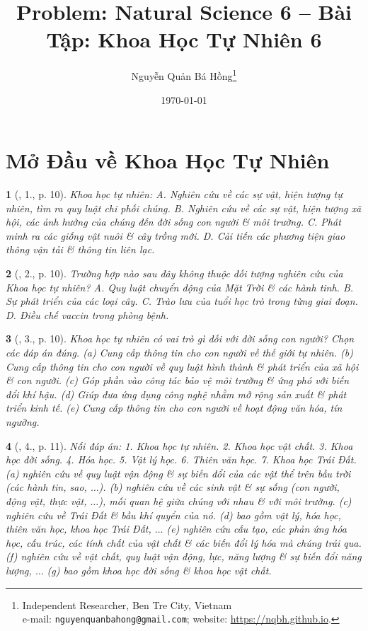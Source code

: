 \documentclass{article}
\title{Problem: Natural Science 6 -- Bài Tập: Khoa Học Tự Nhiên 6}
\author{Nguyễn Quản Bá Hồng\footnote{Independent Researcher, Ben Tre City, Vietnam\\e-mail: \texttt{nguyenquanbahong@gmail.com}; website: \url{https://nqbh.github.io}.}}
\date{\today}
\newtheorem{baitoan}{}
\begin{document}
\maketitle
\tableofcontents


\section{Mở Đầu về Khoa Học Tự Nhiên}

\begin{baitoan}[\cite{ncpt_KHTN_6_tap_1}, 1., p. 10]
	Khoa học tự nhiên: {\sf A.} Nghiên cứu về các sự vật, hiện tượng tự nhiên, tìm ra quy luật chi phối chúng. {\sf B.} Nghiên cứu về các sự vật, hiện tượng xã hội, các ảnh hưởng của chúng đến đời sống con người \& môi trường. {\sf C.} Phát minh ra các giống vật nuôi \& cây trồng mới. {\sf D.} Cải tiến các phương tiện giao thông vận tải \& thông tin liên lạc.
\end{baitoan}

\begin{baitoan}[\cite{ncpt_KHTN_6_tap_1}, 2., p. 10]
	Trường hợp nào sau đây không thuộc đối tượng nghiên cứu của Khoa học tự nhiên? {\sf A.} Quy luật chuyển động của Mặt Trời \& các hành tinh. {\sf B.} Sự phát triển của các loại cây. {\sf C.} Trào lưu của tuổi học trò trong từng giai đoạn. {\sf D.} Điều chế vaccin trong phòng bệnh.
\end{baitoan}

\begin{baitoan}[\cite{ncpt_KHTN_6_tap_1}, 3., p. 10]
	Khoa học tự nhiên có vai trò gì đối với đời sống con người? Chọn các đáp án đúng. (a) Cung cấp thông tin cho con người về thế giới tự nhiên. (b) Cung cấp thông tin cho con người về quy luật hình thành \& phát triển của xã hội \& con người. (c) Góp phần vào công tác bảo vệ môi trường \& ứng phó với biến đổi khí hậu. (d) Giúp đưa ứng dụng công nghệ nhằm mở rộng sản xuất \& phát triển kinh tế. (e) Cung cấp thông tin cho con người về hoạt động văn hóa, tín ngưỡng.
\end{baitoan}

\begin{baitoan}[\cite{ncpt_KHTN_6_tap_1}, 4., p. 11]
	Nối đáp án: 1. Khoa học tự nhiên. 2. Khoa học vật chất. 3. Khoa học đời sống. 4. Hóa học. 5. Vật lý học. 6. Thiên văn học. 7. Khoa học Trái Đất. (a) nghiên cứu về quy luật vận động \& sự biến đổi của các vật thể trên bầu trời (các hành tin, sao, $\ldots$). (b) nghiên cứu về các sinh vật \& sự sống (con người, động vật, thực vật, $\ldots$), mối quan hệ giữa chúng với nhau \& với môi trường. (c) nghiên cứu về Trái Đất \& bầu khí quyển của nó. (d) bao gồm vật lý, hóa học, thiên văn học, khoa học Trái Đất, $\ldots$ (e) nghiên cứu cấu tạo, các phản ứng hóa học, cấu trúc, các tính chất của vật chất \& các biến đổi lý hóa mà chúng trải qua. (f) nghiên cứu về vật chất, quy luật vận động, lực, năng lượng \& sự biến đổi năng lượng, $\ldots$ (g) bao gồm khoa học đời sống \& khoa học vật chất.
\end{baitoan}
\end{document}
